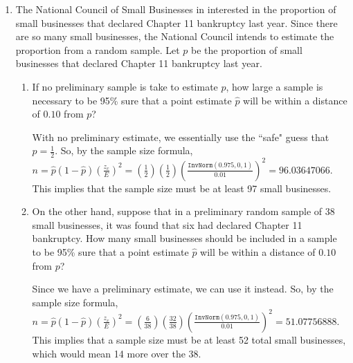 \documentclass{article}
\newcommand{\answer}[1]{\color{white}#1}
\begin{document}
\begin{enumerate}
\item The National Council of Small Businesses in interested in the proportion of small businesses that declared Chapter 11 bankruptcy last year. Since there are so many small businesses, the National Council intends to estimate the proportion from a random sample. Let $p$ be the proportion of small businesses that declared Chapter 11 bankruptcy last year.
	\begin{enumerate}
	\item If no preliminary sample is take to estimate $p$, how large a sample is necessary to be 95\% sure that a point estimate $\hat{p}$ will be within a distance of $0.10$ from $p$? 
	
	{\answer With no preliminary estimate, we essentially use the ``safe" guess that $p= \frac{1}{2}$.  
	So, by the sample size formula, $n = \hat{p}(1-\hat{p})\left(\frac{z_c}{E}\right)^2 = \left(\frac{1}{2}\right)\left(\frac{1}{2}\right)\left(\frac{\texttt{InvNorm}(0.975,0,1)}{0.01}\right)^2 = 96.03647066$.  
	This implies that the sample size must be at least 97 small businesses.
	} 
	
	\item On the other hand, suppose that in a preliminary random sample of 38 small businesses, it was found that six had declared Chapter 11 bankruptcy. How many small businesses should be included in a sample to be 95\% sure that a point estimate $\hat{p}$ will be within a distance of $0.10$ from $p$? 
	
	{\answer Since we have a preliminary estimate, we can use it instead.  
	So, by the sample size formula, $n = \hat{p}(1-\hat{p})\left(\frac{z_c}{E}\right)^2 = \left(\frac{6}{38}\right)\left(\frac{32}{38}\right)\left(\frac{\texttt{InvNorm}(0.975,0,1)}{0.01}\right)^2 = 51.07756888$.  
	This implies that a sample size must be at least 52 total small businesses, which would mean 14 more over the 38.
	} 
	\end{enumerate}

\end{enumerate}

\vfill
\end{document}
